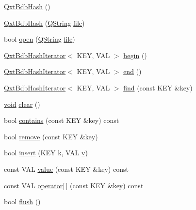 \begin{DoxyCompactItemize}
\item 
\hyperlink{class_qxt_bdb_hash_a8b2c05b466ad89632cc59faee7c51951}{Qxt\-Bdb\-Hash} ()
\item 
\hyperlink{class_qxt_bdb_hash_a869c12fd002d11d1f147149aea6c04af}{Qxt\-Bdb\-Hash} (\hyperlink{group___u_a_v_objects_plugin_gab9d252f49c333c94a72f97ce3105a32d}{Q\-String} \hyperlink{uavobjecttemplate_8m_a97c04efa65bcf0928abf9260bc5cbf46}{file})
\item 
bool \hyperlink{class_qxt_bdb_hash_ad5cbf60bd04c339d2904ba6cde243a3d}{open} (\hyperlink{group___u_a_v_objects_plugin_gab9d252f49c333c94a72f97ce3105a32d}{Q\-String} \hyperlink{uavobjecttemplate_8m_a97c04efa65bcf0928abf9260bc5cbf46}{file})
\item 
\hyperlink{class_qxt_bdb_hash_iterator}{Qxt\-Bdb\-Hash\-Iterator}$<$ K\-E\-Y, V\-A\-L $>$ \hyperlink{class_qxt_bdb_hash_a2268d9caeab4e7071389fe84f95637ae}{begin} ()
\item 
\hyperlink{class_qxt_bdb_hash_iterator}{Qxt\-Bdb\-Hash\-Iterator}$<$ K\-E\-Y, V\-A\-L $>$ \hyperlink{class_qxt_bdb_hash_ade09ce8fc64a197406af247601a9ff07}{end} ()
\item 
\hyperlink{class_qxt_bdb_hash_iterator}{Qxt\-Bdb\-Hash\-Iterator}$<$ K\-E\-Y, V\-A\-L $>$ \hyperlink{class_qxt_bdb_hash_a6e4dab3a24a037406af101b50c87b73f}{find} (const K\-E\-Y \&key)
\item 
\hyperlink{group___u_a_v_objects_plugin_ga444cf2ff3f0ecbe028adce838d373f5c}{void} \hyperlink{class_qxt_bdb_hash_ac95a03bc90a10197c09416ae21129cfe}{clear} ()
\item 
bool \hyperlink{class_qxt_bdb_hash_a5c3455be00aef9bd384162b10e8dd36d}{contains} (const K\-E\-Y \&key) const 
\item 
bool \hyperlink{class_qxt_bdb_hash_af5857965c6845d31ace9cbdf6055d57d}{remove} (const K\-E\-Y \&key)
\item 
bool \hyperlink{class_qxt_bdb_hash_aa816325e53496fdcdb6eba49b9486469}{insert} (K\-E\-Y k, V\-A\-L \hyperlink{glext_8h_a14cfbe2fc2234f5504618905b69d1e06}{v})
\item 
const V\-A\-L \hyperlink{class_qxt_bdb_hash_a345afc11b2cdca29f8705854d0ed15a0}{value} (const K\-E\-Y \&key) const 
\item 
const V\-A\-L \hyperlink{class_qxt_bdb_hash_a1a7f545b56389b3667e23069bbd55c82}{operator\mbox{[}$\,$\mbox{]}} (const K\-E\-Y \&key) const 
\item 
bool \hyperlink{class_qxt_bdb_hash_a124dd2b65f23469274a9627d7af2c897}{flush} ()
\end{DoxyCompactItemize}


